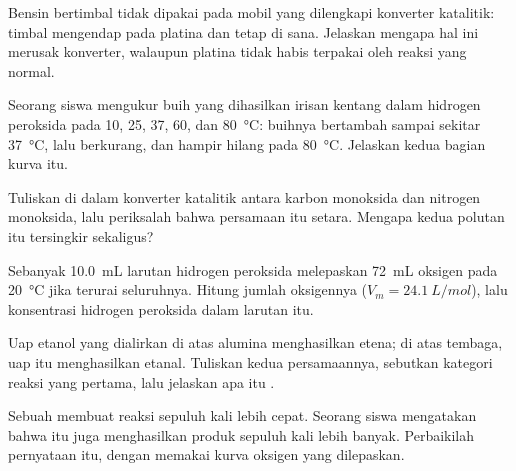 \begin{exercise}[$\star\star$]\label{exo:g12:catalysis:8}
Bensin bertimbal tidak dipakai pada mobil yang dilengkapi konverter
katalitik: timbal mengendap pada platina dan tetap di sana. Jelaskan
mengapa hal ini merusak konverter, walaupun platina tidak habis terpakai
oleh reaksi yang normal.
\end{exercise}

\begin{exercise}[$\star\star$]\label{exo:g12:catalysis:9}
Seorang siswa mengukur buih yang dihasilkan irisan kentang dalam
hidrogen peroksida pada 10, 25, 37, 60, dan \qty{80}{\celsius}: buihnya
bertambah sampai sekitar \qty{37}{\celsius}, lalu berkurang, dan hampir
hilang pada \qty{80}{\celsius}. Jelaskan kedua bagian kurva itu.
\end{exercise}

\begin{exercise}[$\star\star$]\label{exo:g12:catalysis:10}
Tuliskan  di dalam konverter katalitik antara karbon
monoksida dan nitrogen monoksida, lalu periksalah bahwa persamaan itu
setara. Mengapa kedua polutan itu tersingkir sekaligus?
\end{exercise}

\begin{exercise}[$\star\star$]\label{exo:g12:catalysis:11}
Sebanyak \qty{10.0}{mL} larutan hidrogen peroksida melepaskan
\qty{72}{mL} oksigen pada \qty{20}{\celsius} jika terurai seluruhnya.
Hitung jumlah oksigennya ($V_m = \qty{24.1}{L/mol}$), lalu konsentrasi
hidrogen peroksida dalam larutan itu.
\end{exercise}

\begin{exercise}[$\star\star\star$]\label{exo:g12:catalysis:12}
Uap etanol yang dialirkan di atas alumina menghasilkan etena; di atas
tembaga, uap itu menghasilkan etanal. Tuliskan kedua persamaannya,
sebutkan kategori reaksi yang pertama, lalu jelaskan apa itu .
\end{exercise}

\begin{exercise}[$\star\star\star$]\label{exo:g12:catalysis:13}
Sebuah  membuat reaksi sepuluh kali lebih cepat. Seorang siswa
mengatakan bahwa  itu juga menghasilkan produk sepuluh kali lebih
banyak. Perbaikilah pernyataan itu, dengan memakai kurva oksigen yang
dilepaskan.
\end{exercise}

